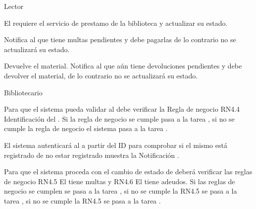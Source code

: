 \begin{PDescripcion}

  \Ppaso Lector

    \begin{enumerate}

      \Ppaso[\itarea]  El  requiere el servicio de prestamo de la biblioteca y actualizar su estado.

\Ppaso[\itarea] Notifica al  que tiene multas pendientes y debe pagarlas de lo contrario no se actualizará su estado.

      \Ppaso[\itarea]  Devuelve el material. Notifica al  que aún tiene devoluciones pendientes y debe devolver el material, de lo contrario no se actualizará su estado.
	

    \end{enumerate}
    
    
  \Ppaso Bibliotecario 

    \begin{enumerate}

      \Ppaso[\itarea]  Para que el sistema pueda validar al  debe verificar la Regla de negocio RN4.4 Identificación del . Si la regla de negocio se cumple pasa a la tarea , si no se cumple la regla de negocio el sistema pasa a la tarea .



      \Ppaso[\itarea]  El sistema autenticará al  a partir del ID para comprobar si el mismo está registrado de no estar registrado muestra la Notificación .
      
      \Ppaso[\itarea] Para que el sistema proceda con el cambio de estado de  deberá verificar las reglas de negocio RN4.5 El  tiene multas y RN4.6 El  tiene adeudos. Si las reglas de negocio se cumplen se pasa a la tarea , si no se cumple la RN4.5 se pasa a la tarea , si no se cumple la RN4.5 se pasa a la tarea .    
     

\end{enumerate}
\end{PDescripcion}
